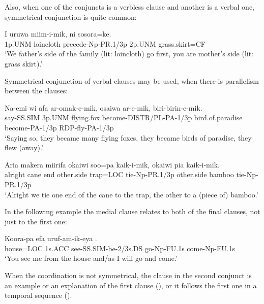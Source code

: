 Also, when one of the conjuncts is a verbless clause and another is a verbal one, symmetrical conjunction is quite common:

\ea%
\label{ex:x1391}
\gll I  uruwa  miim-i-mik,  ni  sosora=ke.\\
1p.UNM  loincloth  precede-Np-PR.1/3p  2p.UNM  grass.skirt=CF\\
\glt `We father's side of the family (lit: loincloth) go first, you are mother's side (lit: grass skirt).'
\z




Symmetrical conjunction of verbal clauses may be used, when there is parallelism between the clauses:

\ea%
\label{ex:x1368}
\gll Na-emi  wi  afa  ar-omak-e-mik, osaiwa  ar-e-mik,  biri-birin-e-mik.\\
say-SS.SIM  3p.UNM  flying.fox  become-DISTR/PL-PA-1/3p bird.of.paradise  become-PA-1/3p  RDP-fly-PA-1/3p\\
\glt `Saying so, they became many flying foxes, they became birds of paradise, they flew (away).'
\z

\ea%
\label{ex:x1392}
\gll Aria  makera  miirifa  okaiwi  soo=pa  kaik-i-mik, okaiwi  pia  kaik-i-mik.\\
alright  cane  end  other.side  trap=LOC  tie-Np-PR.1/3p other.side  bamboo  tie-Np-PR.1/3p\\
\glt `Alright we tie one end of the cane to the trap, the other to a (piece of) bamboo.'
\z

In the following example the medial clause relates to both of the final clauses, not just to the first one:

\ea%
\label{ex:x1851}
\gll Koora-pa  efa  uruf-am-ik-eya  \textstyleEmphasizedVernacularWords{-}\textstyleEmphasizedVernacularWords{-} \textstyleEmphasizedVernacularWords{-}\textstyleEmphasizedVernacularWords{-}.\\
house=LOC  1s.ACC  see-SS.SIM-be-2/3s.DS  go-Np-FU.1s come-Np-FU.1s\\
\glt `You see me from the house and/as I will go and come.'
\z

When the coordination is not symmetrical, the clause in the second conjunct is an example or an explanation of the first clause (), or it follows the first one in a temporal sequence ().


